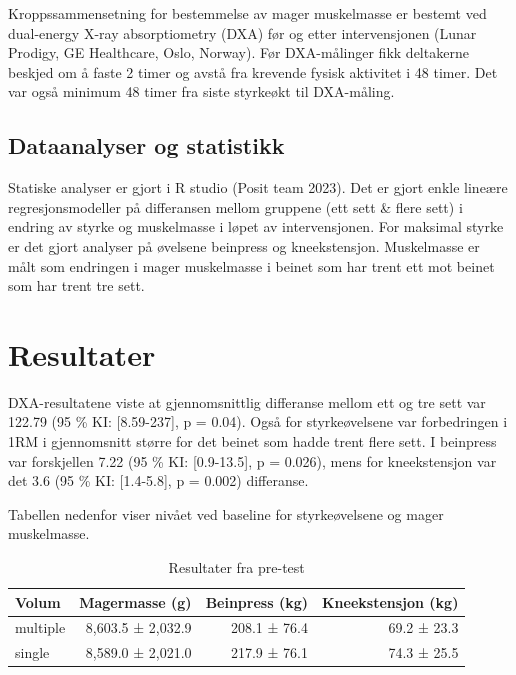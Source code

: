 \documentclass[
  letterpaper,
  DIV=11,
  numbers=noendperiod]{scrreprt}
\begin{document}
Kroppssammensetning for bestemmelse av mager muskelmasse er bestemt ved
dual-energy X-ray absorptiometry (DXA) før og etter intervensjonen
(Lunar Prodigy, GE Healthcare, Oslo, Norway). Før DXA-målinger fikk
deltakerne beskjed om å faste 2 timer og avstå fra krevende fysisk
aktivitet i 48 timer. Det var også minimum 48 timer fra siste styrkeøkt
til DXA-måling.

\subsection{Dataanalyser og
statistikk}\label{dataanalyser-og-statistikk}

Statiske analyser er gjort i R studio (Posit team 2023). Det er gjort
enkle lineære regresjonsmodeller på differansen mellom gruppene (ett
sett \& flere sett) i endring av styrke og muskelmasse i løpet av
intervensjonen. For maksimal styrke er det gjort analyser på øvelsene
beinpress og kneekstensjon. Muskelmasse er målt som endringen i mager
muskelmasse i beinet som har trent ett mot beinet som har trent tre
sett.

\section{Resultater}\label{resultater}

DXA-resultatene viste at gjennomsnittlig differanse mellom ett og tre
sett var 122.79 (95 \% KI: {[}8.59-237{]}, p = 0.04). Også for
styrkeøvelsene var forbedringen i 1RM i gjennomsnitt større for det
beinet som hadde trent flere sett. I beinpress var forskjellen 7.22 (95
\% KI: {[}0.9-13.5{]}, p = 0.026), mens for kneekstensjon var det 3.6
(95 \% KI: {[}1.4-5.8{]}, p = 0.002) differanse.

Tabellen nedenfor viser nivået ved baseline for styrkeøvelsene og mager
muskelmasse.

\begingroup
\fontsize{12.0pt}{14.4pt}\selectfont
\setlength{\LTpost}{0mm}

\begin{longtable}{lrrr}

\caption{\label{tbl-pre}Resultater fra pre-test}

\tabularnewline

\toprule
Volum & Magermasse (g) & Beinpress (kg) & Kneekstensjon (kg) \\ 
\midrule\addlinespace[2.5pt]
multiple & 8,603.5 ± 2,032.9 & 208.1 ± 76.4 & 69.2 ± 23.3 \\ 
single & 8,589.0 ± 2,021.0 & 217.9 ± 76.1 & 74.3 ± 25.5 \\ 
\bottomrule

\end{longtable}
\end{document}
